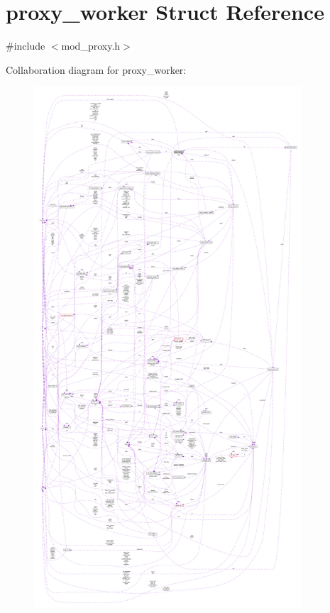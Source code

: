 \hypertarget{structproxy__worker}{}\section{proxy\+\_\+worker Struct Reference}
\label{structproxy__worker}


{\ttfamily \#include $<$mod\+\_\+proxy.\+h$>$}



Collaboration diagram for proxy\+\_\+worker\+:
\nopagebreak
\begin{figure}[H]
\begin{center}
\leavevmode
\includegraphics[height=550pt]{structproxy__worker__coll__graph}
\end{center}
\end{figure}
